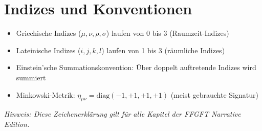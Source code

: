 \vspace{1em}
\section*{Indizes und Konventionen}

\begin{itemize}
    \item Griechische Indizes ($\mu, \nu, \rho, \sigma$) laufen von 0 bis 3 (Raumzeit-Indizes)
    \item Lateinische Indizes ($i, j, k, l$) laufen von 1 bis 3 (räumliche Indizes)
    \item Einstein'sche Summationskonvention: Über doppelt auftretende Indizes wird summiert
    \item Minkowski-Metrik: $\eta_{\mu\nu} = \text{diag}(-1, +1, +1, +1)$ (meist gebrauchte Signatur)
\end{itemize}

\vspace{1em}
\noindent\textit{Hinweis: Diese Zeichenerklärung gilt für alle Kapitel der FFGFT Narrative Edition.}



